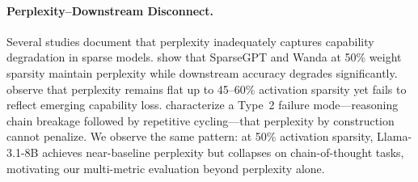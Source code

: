 \paragraph{Perplexity--Downstream Disconnect.}
Several studies document that perplexity inadequately captures capability degradation in sparse models.
\citet{khanal2024ppl} show that SparseGPT and Wanda at 50\% weight sparsity maintain perplexity while downstream accuracy degrades significantly.
\citet{xu2024sparsity} observe that perplexity remains flat up to 45--60\% activation sparsity yet fails to reflect emerging capability loss.
\citet{siam2026type2} characterize a Type~2 failure mode---reasoning chain breakage followed by repetitive cycling---that perplexity by construction cannot penalize.
We observe the same pattern: at 50\% activation sparsity, Llama-3.1-8B achieves near-baseline perplexity but collapses on chain-of-thought tasks, motivating our multi-metric evaluation beyond perplexity alone.
